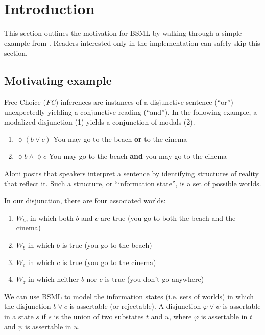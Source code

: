 \section{Introduction}
This section outlines the motivation for BSML by walking through a simple example from \cite{Aloni2022}. Readers interested only in the implementation can safely skip this section. 

\subsection{Motivating example}
Free-Choice (\textit{FC}) inferences are instances of a disjunctive sentence (``or'') unexpectedly yielding a conjunctive reading (``and''). In the following example, a modalized disjunction (1) yields a conjunction of modals (2).

\begin{enumerate}
\item $\lozenge(b\vee c)$ You may go to the beach \textbf{or} to the cinema
\item $\lozenge b \wedge \lozenge c$ You may go to the beach \textbf{and} you may go to the cinema
\end{enumerate}

Aloni \cite{Aloni2022} posits that speakers interpret a sentence by identifying structures of reality that reflect it. Such a structure, or ``information state'', is a set of possible worlds. 

In our disjunction, there are four associated worlds:

\begin{enumerate}
\item $W_{bc}$ in which both $b$ and $c$ are true (you go to both the beach and the cinema)
\item $W_b$ in which $b$ is true (you go to the beach)
\item $W_c$ in which $c$ is true (you go to the cinema)
\item $W_z$ in which neither $b$ nor $c$ is true (you don't go anywhere)
\end{enumerate}

 We can use BSML to model the information states (i.e. sets of worlds) in which the disjunction $b\vee c$ is assertable (or rejectable). A disjunction $\varphi\vee\psi$ is assertable in a state $s$ if $s$ is the union of two substates $t$ and $u$, where $\varphi$ is assertable in $t$ and $\psi$ is assertable in $u$.

